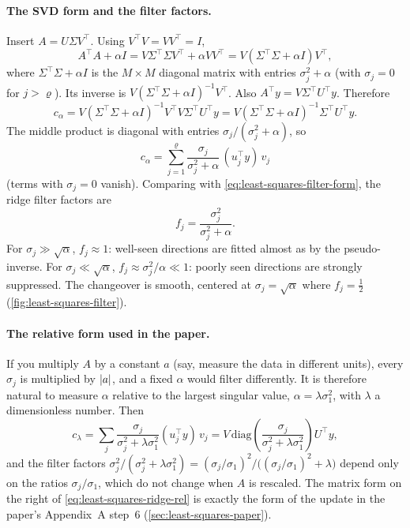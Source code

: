 \paragraph{The SVD form and the filter factors.} Insert $A = U\Sigma V^\top$. Using $V^\top V = VV^\top = I$,
\[
A^\top A + \alpha I = V\Sigma^\top\Sigma V^\top + \alpha VV^\top = V(\Sigma^\top\Sigma + \alpha I)V^\top ,
\]
where $\Sigma^\top\Sigma + \alpha I$ is the $M\times M$ diagonal matrix with entries $\sigma_j^2 + \alpha$ (with $\sigma_j = 0$ for $j>\varrho$). Its inverse is $V(\Sigma^\top\Sigma+\alpha I)^{-1}V^\top$. Also $A^\top y = V\Sigma^\top U^\top y$. Therefore
\[
c_\alpha = V(\Sigma^\top\Sigma+\alpha I)^{-1}V^\top V\Sigma^\top U^\top y = V(\Sigma^\top\Sigma+\alpha I)^{-1}\Sigma^\top U^\top y .
\]
The middle product is diagonal with entries $\sigma_j/(\sigma_j^2+\alpha)$, so
\begin{equation}
\boxed{\,c_\alpha = \sum_{j=1}^{\varrho}\frac{\sigma_j}{\sigma_j^2+\alpha}\,(u_j^\top y)\,v_j\,}
\label{eq:least-squares-ridge-svd}
\end{equation}
(terms with $\sigma_j = 0$ vanish). Comparing with \cref{eq:least-squares-filter-form}, the ridge filter factors are
\begin{equation}
f_j = \frac{\sigma_j^2}{\sigma_j^2 + \alpha}.
\label{eq:least-squares-filter}
\end{equation}
For $\sigma_j\gg\sqrt\alpha$, $f_j\approx 1$: well-seen directions are fitted almost as by the pseudo-inverse. For $\sigma_j\ll\sqrt\alpha$, $f_j\approx\sigma_j^2/\alpha\ll1$: poorly seen directions are strongly suppressed. The changeover is smooth, centered at $\sigma_j = \sqrt\alpha$ where $f_j = \frac12$ (\cref{fig:least-squares-filter}).

\paragraph{The relative form used in the paper.} If you multiply $A$ by a constant $a$ (say, measure the data in different units), every $\sigma_j$ is multiplied by $\left\lvert a\right\rvert$, and a fixed $\alpha$ would filter differently. It is therefore natural to measure $\alpha$ relative to the largest singular value, $\alpha = \lambda\sigma_1^2$, with $\lambda$ a dimensionless number. Then
\begin{equation}
c_\lambda = \sum_{j}\frac{\sigma_j}{\sigma_j^2+\lambda\sigma_1^2}(u_j^\top y)\,v_j = V\,\mathrm{diag}\!\left(\frac{\sigma_j}{\sigma_j^2 + \lambda\sigma_1^2}\right)U^\top y ,
\label{eq:least-squares-ridge-rel}
\end{equation}
and the filter factors $\sigma_j^2/(\sigma_j^2+\lambda\sigma_1^2) = (\sigma_j/\sigma_1)^2/\bigl((\sigma_j/\sigma_1)^2 + \lambda\bigr)$ depend only on the ratios $\sigma_j/\sigma_1$, which do not change when $A$ is rescaled. The matrix form on the right of \cref{eq:least-squares-ridge-rel} is exactly the form of the update in the paper's Appendix~A step~6 (\cref{sec:least-squares-paper}).


